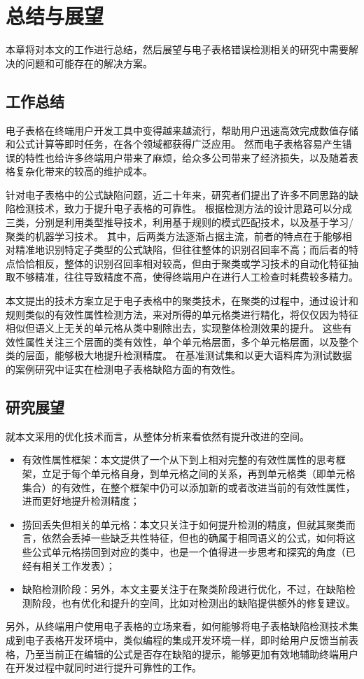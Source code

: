 \chapter{总结与展望}

本章将对本文的工作进行总结，然后展望与电子表格错误检测相关的研究中需要解决的问题和可能存在的解决方案。

\section{工作总结}
电子表格在终端用户开发工具中变得越来越流行，帮助用户迅速高效完成数值存储和公式计算等即时任务，在各个领域都获得广泛应用。
然而电子表格容易产生错误的特性也给许多终端用户带来了麻烦，给众多公司带来了经济损失，以及随着表格复杂化带来的较高的维护成本。

针对电子表格中的公式缺陷问题，近二十年来，研究者们提出了许多不同思路的缺陷检测技术，致力于提升电子表格的可靠性。
根据检测方法的设计思路可以分成三类，分别是利用类型推导技术，利用基于规则的模式匹配技术，以及基于学习/聚类的机器学习技术。
其中，后两类方法逐渐占据主流，前者的特点在于能够相对精准地识别特定子类型的公式缺陷，但往往整体的识别召回率不高；而后者的特点恰恰相反，整体的识别召回率相对较高，但由于聚类或学习技术的自动化特征抽取不够精准，往往导致精度不高，使得终端用户在进行人工检查时耗费较多精力。

本文提出的技术方案立足于电子表格中的聚类技术，在聚类的过程中，通过设计和规则类似的有效性属性检测方法，来对所得的单元格类进行精化，将仅仅因为特征相似但语义上无关的单元格从类中剔除出去，实现整体检测效果的提升。
这些有效性属性关注三个层面的类有效性，单个单元格层面，多个单元格层面，以及整个类的层面，能够极大地提升检测精度。
在基准测试集和以更大语料库为测试数据的案例研究中证实\wa 在检测电子表格缺陷方面的有效性。

\section{研究展望}

就本文采用的优化技术而言，\wa 从整体分析来看依然有提升改进的空间。
\begin{itemize}
    \item 有效性属性框架：本文提供了一个从下到上相对完整的有效性属性的思考框架，立足于每个单元格自身，到单元格之间的关系，再到单元格类（即单元格集合）的有效性，在整个框架中仍可以添加新的或者改进当前的有效性属性，进而更好地提升检测精度；
    \item 捞回丢失但相关的单元格：本文只关注于如何提升检测的精度，但就其聚类而言，依然会丢掉一些缺乏共性特征，但也的确属于相同语义的公式，如何将这些公式单元格捞回到对应的类中，也是一个值得进一步思考和探究的角度（已经有相关工作\cite{huang2020warder}发表）；
    \item 缺陷检测阶段：另外，本文主要关注于在聚类阶段进行优化，不过，在缺陷检测阶段，也有优化和提升的空间，比如对检测出的缺陷提供额外的修复建议。
\end{itemize}

另外，从终端用户使用电子表格的立场来看，如何能够将电子表格缺陷检测技术集成到电子表格开发环境中，类似编程的集成开发环境一样，即时给用户反馈当前表格，乃至当前正在编辑的公式是否存在缺陷的提示，能够更加有效地辅助终端用户在开发过程中就同时进行提升可靠性的工作。
